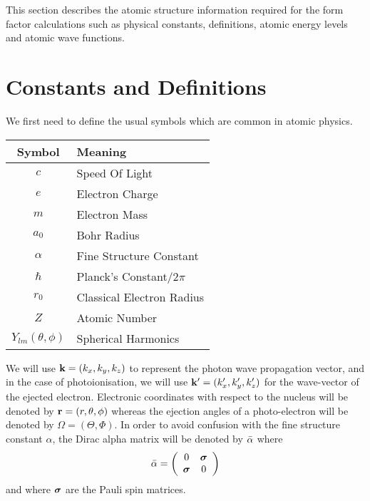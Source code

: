 
This section describes the atomic structure information required for the form
factor calculations such as physical constants, definitions, atomic energy
levels and atomic wave functions.

\section{Constants and Definitions}
We first need to define the usual symbols which are common in atomic physics.
\begin{center}
\begin{tabular}{|c|l|} \hline
    Symbol                  &   Meaning                     \\ \hline \hline
    $c$                     &   Speed Of Light              \\
    $e$                     &   Electron Charge             \\
    $m$                     &   Electron Mass               \\
    $a_0$                   &   Bohr Radius                 \\ 
    $\alpha$                &   Fine Structure Constant     \\
    $\hbar$                 &   Planck's Constant/$2\pi$    \\
    $r_0$                   &   Classical Electron Radius   \\
    $Z$                     &   Atomic Number               \\
    $Y_{lm}(\theta,\phi)$   &   Spherical Harmonics         \\
    \hline
\end{tabular}
\end{center}
We will use $\mathbf{k} = (k_x,k_y,k_z)$ to represent the photon wave propagation
vector, and in the case of photoionisation, we will use $\mathbf{k'} =
(k'_x,k'_y,k'_z)$ for the wave-vector of the ejected electron.
Electronic coordinates with respect to the nucleus will be denoted by 
$\mathbf{r} = (r,\theta,\phi)$ whereas the ejection angles of a photo-electron will
be denoted by $\Omega = (\Theta,\Phi)$.
In order to avoid confusion with the fine structure constant $\alpha$,
the Dirac alpha matrix will be denoted by $\bar{\alpha}$ where
\begin{equation}
    \bar{\alpha} = 
    \left(
        \begin{array}{cc}
            0                           &   \mbox{\boldmath $\sigma$} \\
            \mbox{\boldmath $\sigma$}   &   0
        \end{array}
    \right)
\end{equation}
and where $\mbox{\boldmath $\sigma$}$ are the Pauli spin matrices.

